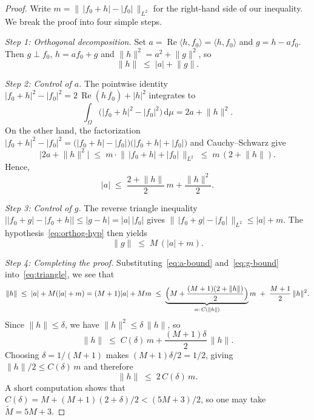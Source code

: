 \documentclass[11pt]{amsart}
\theoremstyle{remark}
\begin{document}
\begin{proof}
Write $m = \bigl\|\, \lvert f_0 + h \rvert - \lvert f_0 \rvert \,\bigr\|_{L^2}$ for the right-hand side of our inequality. We break the proof into four simple steps.
 \vspace{0.5em}

\noindent
\emph{Step 1: Orthogonal decomposition.}\;
Set $a = \operatorname{Re}\langle h,f_0\rangle = \langle h,f_0\rangle$ and
$g = h - a f_0$.  Then $g \perp f_0$, $h = af_0 + g$ and
$\lVert h \rVert^2 = a^2 + \lVert g \rVert^2$, so
\begin{equation}\label{eq:triangle}
\lVert h \rVert \;\le\; \lvert a \rvert + \lVert g \rVert.
\end{equation}

\noindent
\emph{Step 2: Control of $a$.}\;
The pointwise identity
$\lvert f_0 + h \rvert^2 - \lvert f_0 \rvert^2
= 2\,\operatorname{Re}(h\,\overline{f_0}) + \lvert h \rvert^2$
integrates to
\[
\int_\Omega \bigl(\lvert f_0 + h \rvert^2 - \lvert f_0 \rvert^2\bigr)\,\mathrm{d}\mu
= 2a + \lVert h \rVert^2.
\]
On the other hand, the factorization
$\lvert f_0 + h \rvert^2 - \lvert f_0 \rvert^2
= \bigl(\lvert f_0 + h \rvert - \lvert f_0 \rvert\bigr)
  \bigl(\lvert f_0 + h \rvert + \lvert f_0 \rvert\bigr)$
and Cauchy--Schwarz give
\[
\lvert 2a + \lVert h \rVert^2 \rvert
\;\le\;
m \cdot \bigl\|\, \lvert f_0 + h \rvert + \lvert f_0 \rvert \,\bigr\|_{L^2}
\;\le\;
m\,(2 + \lVert h \rVert).
\]
Hence,
\begin{equation}\label{eq:a-bound}
\lvert a \rvert
\;\le\;
\frac{2 + \lVert h \rVert}{2}\, m
+ \frac{\lVert h \rVert^2}{2}.
\end{equation}


\noindent
\emph{Step 3: Control of $g$.}\;
The reverse triangle inequality
$\bigl\lvert \lvert f_0 + g \rvert - \lvert f_0 + h \rvert \bigr\rvert
\le \lvert g - h \rvert = \lvert a \rvert\,\lvert f_0 \rvert$
gives
$\bigl\|\, \lvert f_0 + g \rvert - \lvert f_0 \rvert \,\bigr\|_{L^2}
\le \lvert a \rvert + m$.
The hypothesis~\eqref{eq:orthog-hyp} then yields
\begin{equation}\label{eq:g-bound}
\lVert g \rVert \;\le\; M\,(\lvert a \rvert + m).
\end{equation}


\noindent
\emph{Step 4: Completing the proof.}\;
Substituting~\eqref{eq:a-bound} and~\eqref{eq:g-bound}
into~\eqref{eq:triangle}, we see that
\[
\lVert h \rVert
\;\le\;
\lvert a \rvert + M(\lvert a \rvert + m)
= (M+1)\lvert a \rvert + Mm
\;\le\;
\underbrace{\Bigl(M + \frac{(M+1)(2+\lVert h \rVert)}{2}\Bigr)}_{=:\, C(\lVert h \rVert)}
m
\;+\; \frac{M+1}{2}\,\lVert h \rVert^2.
\]
Since $\lVert h \rVert \le \delta$, we have $\lVert h \rVert^2 \le \delta\,\lVert h \rVert$, so
\[
\lVert h \rVert
\;\le\; C(\delta)\, m + \frac{(M+1)\delta}{2}\,\lVert h \rVert.
\]
Choosing $\delta = 1/(M+1)$ makes $(M+1)\delta/2 = 1/2$, giving
$\lVert h \rVert/2 \le C(\delta)\, m$ and therefore
\[
\lVert h \rVert \;\le\; 2\, C(\delta)\, m.
\]
A short computation shows that
$C(\delta) = M + (M+1)(2 + \delta)/2 < (5M+3)/2$, so one may take
$\widetilde{M} = 5M + 3$.
\end{proof}
\end{document}
